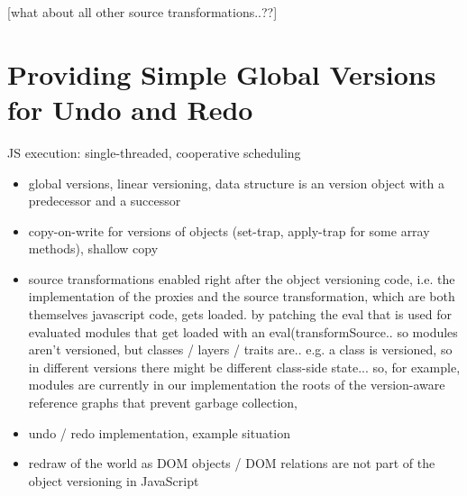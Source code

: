 [what about all other source transformations..??]




\section{Providing Simple Global Versions for Undo and Redo}

JS execution: single-threaded, cooperative scheduling 

\begin{itemize}
    \item global versions, linear versioning, data structure is an version object with a predecessor and a successor
    \item copy-on-write for versions of objects (set-trap, apply-trap for some array methods), shallow copy
\end{itemize}


\begin{itemize}
    \item source transformations enabled right after the object versioning code, i.e. the implementation of the proxies and the source transformation, which are both themselves javascript code, gets loaded. by patching the eval that is used for evaluated modules that get loaded with an eval(transformSource.. so modules aren’t versioned, but classes / layers / traits are.. e.g. a class is versioned, so in different versions there might be different class-side state... so, for example, modules are currently in our implementation the roots of the version-aware reference graphs that prevent garbage collection, 
\end{itemize}


\begin{itemize}
    \item undo / redo implementation, example situation
    \item redraw of the world as DOM objects / DOM relations are not part of the object versioning in JavaScript
\end{itemize}






